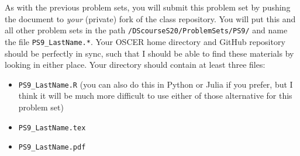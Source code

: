 \documentclass[12pt,english]{exam}
\begin{document}
As with the previous problem sets, you will submit this problem set by pushing the document to \emph{your} (private) fork of the class repository. You will put this and all other problem sets in the path \texttt{/DScourseS20/ProblemSets/PS9/} and name the file \texttt{PS9\_LastName.*}. Your OSCER home directory and GitHub repository should be perfectly in sync, such that I should be able to find these materials by looking in either place. Your directory should contain at least three files:
\begin{itemize}
    \item \texttt{PS9\_LastName.R} (you can also do this in Python or Julia if you prefer, but I think it will be much more difficult to use either of those alternative for this problem set)
    \item \texttt{PS9\_LastName.tex}
    \item \texttt{PS9\_LastName.pdf}
\end{itemize}
\end{document}
